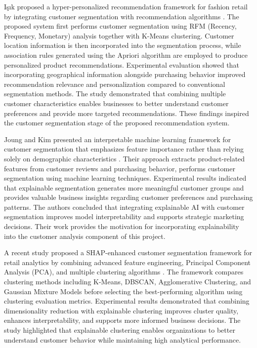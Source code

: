 \documentclass[12pt, a4paper]{report}
\numberwithin{figure}{chapter}
\numberwithin{table}{chapter}
\numberwithin{equation}{chapter}
\begin{document}
I\c{s}\i k proposed a hyper-personalized recommendation framework for fashion retail by integrating customer segmentation with recommendation algorithms \cite{isik}. The proposed system first performs customer segmentation using RFM (Recency, Frequency, Monetary) analysis together with K-Means clustering. Customer location information is then incorporated into the segmentation process, while association rules generated using the Apriori algorithm are employed to produce personalized product recommendations. Experimental evaluation showed that incorporating geographical information alongside purchasing behavior improved recommendation relevance and personalization compared to conventional segmentation methods. The study demonstrated that combining multiple customer characteristics enables businesses to better understand customer preferences and provide more targeted recommendations. These findings inspired the customer segmentation stage of the proposed recommendation system.

Joung and Kim presented an interpretable machine learning framework for customer segmentation that emphasizes feature importance rather than relying solely on demographic characteristics \cite{joung}. Their approach extracts product-related features from customer reviews and purchasing behavior, performs customer segmentation using machine learning techniques. Experimental results indicated that explainable segmentation generates more meaningful customer groups and provides valuable business insights regarding customer preferences and purchasing patterns. The authors concluded that integrating explainable AI with customer segmentation improves model interpretability and supports strategic marketing decisions. Their work provides the motivation for incorporating explainability into the customer analysis component of this project.

A recent study proposed a SHAP-enhanced customer segmentation framework for retail analytics by combining advanced feature engineering, Principal Component Analysis (PCA), and multiple clustering algorithms \cite{pcadbscan}. The framework compares clustering methods including K-Means, DBSCAN, Agglomerative Clustering, and Gaussian Mixture Models before selecting the best-performing algorithm using clustering evaluation metrics. Experimental results demonstrated that combining dimensionality reduction with explainable clustering improves cluster quality, enhances interpretability, and supports more informed business decisions. The study highlighted that explainable clustering enables organizations to better understand customer behavior while maintaining high analytical performance.
\end{document}
